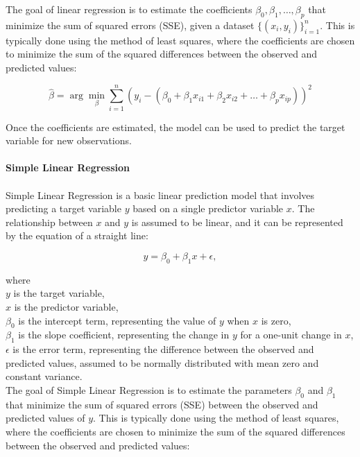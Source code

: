 \documentclass[12pt]{article}
\begin{document}
\noindent The goal of linear regression is to estimate
the coefficients $\beta_0, \beta_1, \ldots, \beta_p$ that minimize the sum of squared
errors (SSE), given a dataset $\{(x_i, y_i)\}_{i=1}^n$. This is typically done using the
method of least squares, where the coefficients are chosen to minimize the sum of the
squared differences between the observed and predicted values:

\begin{equation}
    \hat{\beta} = \arg \min_{\beta} \sum_{i=1}^{n} (y_i - (\beta_0 + \beta_1 x_{i1} + \beta_2 x_{i2} + \ldots + \beta_p x_{ip}))^2
\end{equation}

\noindent Once the coefficients are estimated, the model can be used to predict the target
variable for new observations.\\
\\
\textbf{Simple Linear Regression}\\
\\
Simple Linear Regression is a basic linear prediction model that involves predicting a target
variable \(y\) based on a single predictor variable \(x\). The relationship
between \(x\) and \(y\) is assumed to be linear, and it can be represented by the
equation of a straight line:

\begin{equation}
    y = \beta_0 + \beta_1 x + \epsilon,
\end{equation}

\noindent where\\
\(y\) is the target variable,\\
\(x\) is the predictor variable,\\
\(\beta_0\) is the intercept term, representing the value of \(y\) when \(x\) is zero,\\
\(\beta_1\) is the slope coefficient, representing the change in \(y\) for a one-unit change in \(x\),\\
\(\epsilon\) is the error term, representing the difference between the observed and predicted values, assumed to be normally distributed with mean zero and constant variance.\\

\noindent The goal of Simple Linear Regression is to estimate the parameters \(\beta_0\) and \(\beta_1\) that minimize the sum of squared errors (SSE) between the observed and predicted values of \(y\). This is typically done using the method of least squares, where the coefficients are chosen to minimize the sum of the squared differences between the observed and predicted values:
\end{document}
